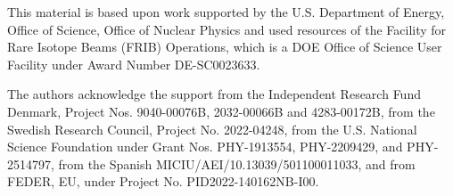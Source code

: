 \documentclass[

reprint,

superscriptaddress,









amsmath,amssymb,
aps,






floatfix,
prl
]{revtex4-2}
\begin{document}
\begin{acknowledgments}





This material is based upon work supported by the U.S. Department of Energy, Office of Science, Office of Nuclear Physics and used resources of the Facility for Rare Isotope Beams (FRIB) Operations, which is a DOE Office of Science User Facility under Award Number DE-SC0023633.

The authors acknowledge the support from the Independent Research Fund Denmark, Project Nos. 9040-00076B, 2032-00066B and 4283-00172B, from the Swedish Research Council, Project No. 2022-04248, from the U.S. National Science Foundation under Grant Nos. PHY-1913554, PHY-2209429, and PHY-2514797, from the Spanish MICIU/AEI/10.13039/501100011033, and from FEDER, EU, under Project No. PID2022-140162NB-I00.

\end{acknowledgments}


\end{document}
